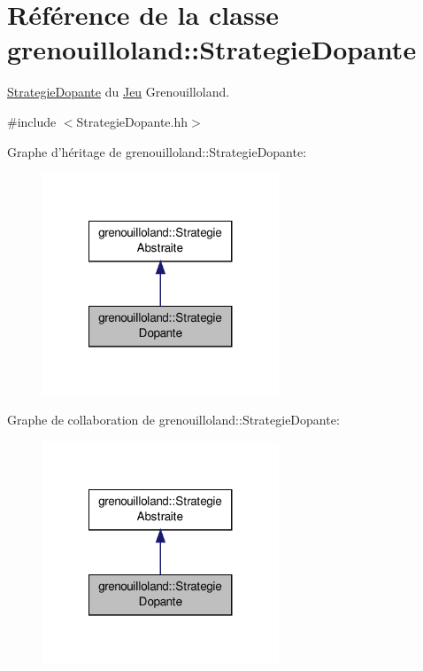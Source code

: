 \hypertarget{classgrenouilloland_1_1StrategieDopante}{\section{Référence de la classe grenouilloland\-:\-:Strategie\-Dopante}
\label{classgrenouilloland_1_1StrategieDopante}
}


\hyperlink{classgrenouilloland_1_1StrategieDopante}{Strategie\-Dopante} du \hyperlink{classgrenouilloland_1_1Jeu}{Jeu} Grenouilloland.  




{\ttfamily \#include $<$Strategie\-Dopante.\-hh$>$}



Graphe d'héritage de grenouilloland\-:\-:Strategie\-Dopante\-:
\nopagebreak
\begin{figure}[H]
\begin{center}
\leavevmode
\includegraphics[width=200pt]{classgrenouilloland_1_1StrategieDopante__inherit__graph}
\end{center}
\end{figure}


Graphe de collaboration de grenouilloland\-:\-:Strategie\-Dopante\-:
\nopagebreak
\begin{figure}[H]
\begin{center}
\leavevmode
\includegraphics[width=200pt]{classgrenouilloland_1_1StrategieDopante__coll__graph}
\end{center}
\end{figure}
